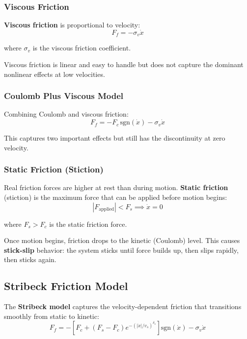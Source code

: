 \subsubsection{Viscous Friction}

\textbf{Viscous friction} is proportional to velocity:
\begin{equation}
F_f = -\sigma_v \dot{x}
\label{eq:viscous_friction}
\end{equation}

where $\sigma_v$ is the viscous friction coefficient.

Viscous friction is linear and easy to handle but does not capture the dominant nonlinear effects at low velocities.

\subsubsection{Coulomb Plus Viscous Model}

Combining Coulomb and viscous friction:
\begin{equation}
F_f = -F_c \, \text{sgn}(\dot{x}) - \sigma_v \dot{x}
\label{eq:coulomb_viscous}
\end{equation}

This captures two important effects but still has the discontinuity at zero velocity.

\subsubsection{Static Friction (Stiction)}

Real friction forces are higher at rest than during motion. \textbf{Static friction} (stiction) is the maximum force that can be applied before motion begins:
\begin{equation}
|F_{\text{applied}}| < F_s \implies \dot{x} = 0
\end{equation}

where $F_s > F_c$ is the static friction force.

Once motion begins, friction drops to the kinetic (Coulomb) level. This causes \textbf{stick-slip} behavior: the system sticks until force builds up, then slips rapidly, then sticks again.

\subsection{Stribeck Friction Model}

The \textbf{Stribeck model} captures the velocity-dependent friction that transitions smoothly from static to kinetic:
\begin{equation}
F_f = -\left[F_c + (F_s - F_c)e^{-(|\dot{x}|/v_s)^{\delta_s}}\right]\text{sgn}(\dot{x}) - \sigma_v \dot{x}
\label{eq:stribeck}
\end{equation}

